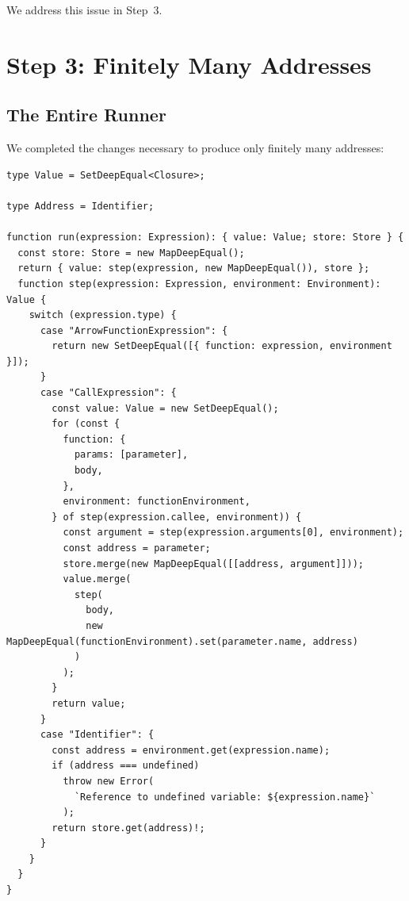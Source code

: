 \documentclass[12pt, oneside]{book}
\begin{document}
We address this issue in Step~3.

\section{Step 3: Finitely Many Addresses}

\subsection{The Entire Runner}

We completed the changes necessary to produce only finitely many addresses:

\begin{verbatim}
type Value = SetDeepEqual<Closure>;

type Address = Identifier;

function run(expression: Expression): { value: Value; store: Store } {
  const store: Store = new MapDeepEqual();
  return { value: step(expression, new MapDeepEqual()), store };
  function step(expression: Expression, environment: Environment): Value {
    switch (expression.type) {
      case "ArrowFunctionExpression": {
        return new SetDeepEqual([{ function: expression, environment }]);
      }
      case "CallExpression": {
        const value: Value = new SetDeepEqual();
        for (const {
          function: {
            params: [parameter],
            body,
          },
          environment: functionEnvironment,
        } of step(expression.callee, environment)) {
          const argument = step(expression.arguments[0], environment);
          const address = parameter;
          store.merge(new MapDeepEqual([[address, argument]]));
          value.merge(
            step(
              body,
              new MapDeepEqual(functionEnvironment).set(parameter.name, address)
            )
          );
        }
        return value;
      }
      case "Identifier": {
        const address = environment.get(expression.name);
        if (address === undefined)
          throw new Error(
            `Reference to undefined variable: ${expression.name}`
          );
        return store.get(address)!;
      }
    }
  }
}
\end{verbatim}



\backmatter




\end{document}
